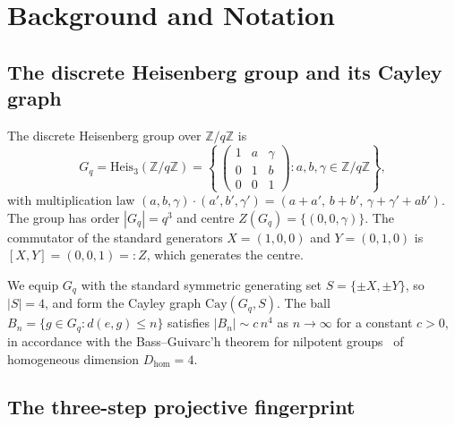 \section{Background and Notation}
  \label{sec:background-and-notation}

  \subsection{The discrete Heisenberg group and its Cayley graph}

    The discrete Heisenberg group over $\mathbb{Z}/q\mathbb{Z}$ is
    \begin{equation}
      G_q = \mathrm{Heis}_3(\mathbb{Z}/q\mathbb{Z})
      = \left\{\,\begin{pmatrix}
                   1&a&\gamma\\0&1&b\\0&0&1
      \end{pmatrix}
          : a,b,\gamma\in\mathbb{Z}/q\mathbb{Z}\right\},
    \end{equation}
    with multiplication law $(a,b,\gamma)\cdot(a',b',\gamma') = (a+a',\,b+b',\,\gamma+\gamma'+ab')$.
    The group has order $|G_q|=q^3$ and centre $Z(G_q)=\{(0,0,\gamma)\}$.
    The commutator of the standard generators $X=(1,0,0)$ and $Y=(0,1,0)$ is
    $[X,Y] = (0,0,1) =: Z$, which generates the centre.

    We equip $G_q$ with the standard symmetric generating set
    $S = \{\pm X,\pm Y\}$,
    so $|S|=4$, and form the Cayley graph $\mathrm{Cay}(G_q,S)$.
    The ball $B_n = \{g\in G_q : d(e,g)\leq n\}$ satisfies
    $|B_n|\sim c\,n^4$ as $n\to\infty$ for a constant $c>0$, in accordance with
    the Bass--Guivarc'h theorem for nilpotent groups~\cite{Bass1972,Guivarch1973} of
    homogeneous dimension $D_{\mathrm{hom}}=4$.

  \subsection{The three-step projective fingerprint}

